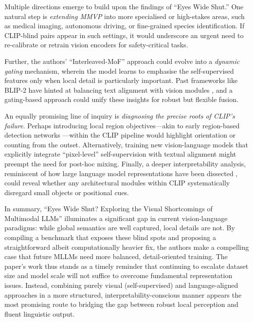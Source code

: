 \documentclass[11pt]{article}
\begin{document}
Multiple directions emerge to build upon the findings of ``Eyes Wide Shut.'' One natural step is \emph{extending MMVP} into more specialised or high-stakes areas, such as medical imaging, autonomous driving, or fine-grained species identification. If CLIP-blind pairs appear in such settings, it would underscore an urgent need to re-calibrate or retrain vision encoders for safety-critical tasks.

Further, the authors' ``Interleaved-MoF'' approach could evolve into a \emph{dynamic gating} mechanism, wherein the model learns to emphasise the self-supervised features only when local detail is particularly important. Past frameworks like BLIP-2 have hinted at balancing text alignment with vision modules \cite{Li2023ICML_BLIP2}, and a gating-based approach could unify these insights for robust but flexible fusion.

An equally promising line of inquiry is \emph{diagnosing the precise roots of CLIP's failure}. Perhaps introducing local region objectives---akin to early region-based detection networks \cite{Girshick2014CVPR,Lin2017CVPR_FPN}---within the CLIP pipeline would highlight orientation or counting from the outset. Alternatively, training new vision-language models that explicitly integrate ``pixel-level'' self-supervision with textual alignment might preempt the need for post-hoc mixing. Finally, a deeper interpretability analysis, reminiscent of how large language model representations have been dissected \cite{Devlin2019NAACL_BERT}, could reveal whether any architectural modules within CLIP systematically disregard small objects or positional cues.

In summary, ``Eyes Wide Shut? Exploring the Visual Shortcomings of Multimodal LLMs'' illuminates a significant gap in current vision-language paradigms: while global semantics are well captured, local details are not. By compiling a benchmark that exposes these blind spots and proposing a straightforward albeit computationally heavier fix, the authors make a compelling case that future MLLMs need more balanced, detail-oriented training. The paper's work thus stands as a timely reminder that continuing to escalate dataset size and model scale will not suffice to overcome fundamental representation issues. Instead, combining purely visual (self-supervised) and language-aligned approaches in a more structured, interpretability-conscious manner appears the most promising route to bridging the gap between robust local perception and fluent linguistic output.
\end{document}
